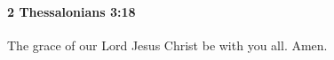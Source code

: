 		\paragraph{2 Thessalonians 3:18} %
			\label{2THESSALONIANS-3-18}

			The grace of our Lord Jesus Christ be with you all.  Amen.

			\begin{framed}
			\scriptsize
				\begin{compactdesc}
					\item[SBLG] 
				\end{compactdesc}
			\end{framed}